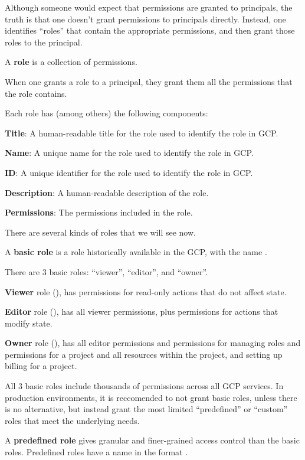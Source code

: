 Although someone would expect that permissions are granted to principals, the truth is that one doesn't grant
permissions to principals directly. Instead, one identifies ``roles'' that contain the appropriate permissions, and
then grant those roles to the principal.

\bd[Role]
A \textbf{role} is a collection of permissions.
\ed

When one grants a role to a principal, they grant them all the permissions that the role contains.

Each role has (among others) the following components:
\bit
\item \textbf{Title}: A human-readable title for the role used to identify the role in GCP\@.
\item \textbf{Name}: A unique name for the role used to identify the role in GCP\@.
\item \textbf{ID}: A unique identifier for the role used to identify the role in GCP\@.
\item \textbf{Description}: A human-readable description of the role.
\item \textbf{Permissions}: The permissions included in the role.
\eit

There are several kinds of roles that we will see now.

A \textbf{basic role} is a role historically available in the GCP, with the name .
\ed

There are 3 basic roles: ``viewer'', ``editor'', and ``owner''.

\bd[Viewer]
\textbf{Viewer} role (), has permissions for read-only actions that do not affect state.
\ed

\bd[Editor]
\textbf{Editor} role (), has all viewer permissions, plus permissions for actions that modify state.
\ed

\bd[Owner]
\textbf{Owner} role (), has all editor permissions and permissions for managing roles and permissions
for a project and all resources within the project, and setting up billing for a project.
\ed

All 3 basic roles include thousands of permissions across all GCP services. In production environments, it is
reccomended to not grant basic roles, unless there is no alternative, but instead grant the most limited ``predefined''
or ``custom'' roles that meet the underlying needs.

A \textbf{predefined role} gives granular and finer-grained access control than the basic roles. Predefined roles have
a name in the format .
\ed

